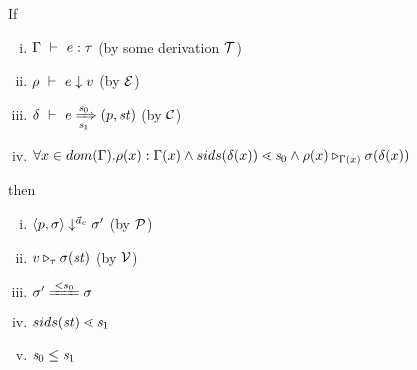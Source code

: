 \begin{thm}
	If 
	\begin{enumerate}[(i)]
		\item $\Type{\Gam}{e}{\tau}$ (by some derivation $\MT$)
		\item $\Eval{\rho}{e}{v}$ (by $\ME$) 
		\item $\Trans{\del}{e}{\s_0}{\s_1}{\sfun{p}{\st}}$ (by $\MC$)
		\item $\forall x \in dom(\Gam).\rho(x):\Gam(x) \wedge sids(\del(x)) \SetLe \s_0  \wedge  \ValRep{\rho(x)}{\Gam(x)}{\sgm(\del(x))}$
	\end{enumerate}
	then 
	\begin{enumerate}[(i)]
		\item $\seval{p}{\sgm}{\a_c}{\sgm'}$ (by $\MP$)
		\item  $\ValRep{v}{\tau}{\sgm(\st)}$ (by $\MV$)
		\item $\sgm' \ConEq{s_0} \sgm $
		\item  $sids(\st) \SetLe \s_1$
		\item $\s_0 \le \s_1$
	\end{enumerate} 
\end{thm}

